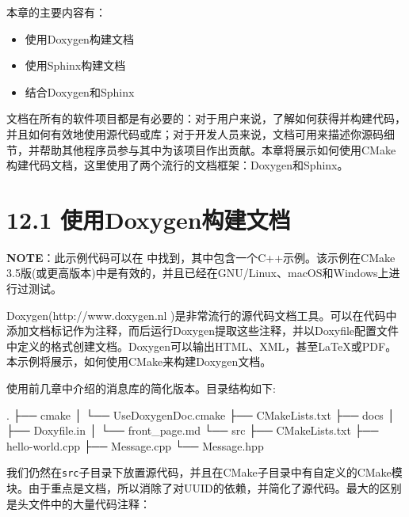 本章的主要内容有：

\begin{itemize}
\item 使用Doxygen构建文档

\item 使用Sphinx构建文档

\item 结合Doxygen和Sphinx

\end{itemize}

文档在所有的软件项目都是有必要的：对于用户来说，了解如何获得并构建代码，并且如何有效地使用源代码或库；对于开发人员来说，文档可用来描述你源码细节，并帮助其他程序员参与其中为该项目作出贡献。本章将展示如何使用CMake构建代码文档，这里使用了两个流行的文档框架：Doxygen和Sphinx。


\section{12.1 使用Doxygen构建文档}

\begin{myInfoBox}
\textbf{NOTE}：此示例代码可以在  中找到，其中包含一个C++示例。该示例在CMake 3.5版(或更高版本)中是有效的，并且已经在GNU/Linux、macOS和Windows上进行过测试。
\end{myInfoBox}

Doxygen(http://www.doxygen.nl )是非常流行的源代码文档工具。可以在代码中添加文档标记作为注释，而后运行Doxygen提取这些注释，并以Doxyfile配置文件中定义的格式创建文档。Doxygen可以输出HTML、XML，甚至LaTeX或PDF。本示例将展示，如何使用CMake来构建Doxygen文档。


使用前几章中介绍的消息库的简化版本。目录结构如下:

\begin{codebox}[shell]
.
├── cmake
│    └── UseDoxygenDoc.cmake
├── CMakeLists.txt
├── docs
│    ├── Doxyfile.in
│    └── front_page.md
└── src
    ├── CMakeLists.txt
    ├── hello-world.cpp
    ├── Message.cpp
    └── Message.hpp
\end{codebox}

我们仍然在\texttt{src}子目录下放置源代码，并且在CMake子目录中有自定义的CMake模块。由于重点是文档，所以消除了对UUID的依赖，并简化了源代码。最大的区别是头文件中的大量代码注释：

